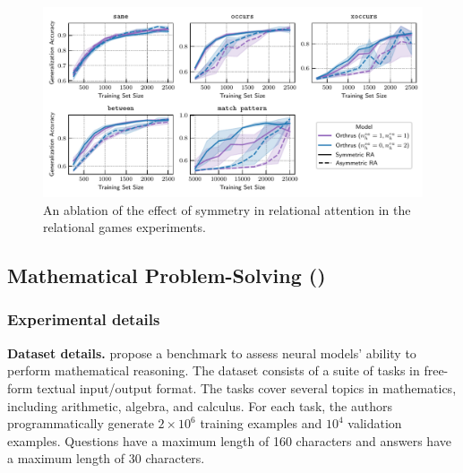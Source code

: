 \begin{figure}[h]
    \centering
    \includegraphics[width=\textwidth]{figs/experiments/relgames/relgames_learning_curves_symmetry_ablation.pdf}
    \caption{An ablation of the effect of symmetry in relational attention in the relational games experiments.}\label{fig:relgames_symmetry_ablation}
\end{figure}

\subsection{Mathematical Problem-Solving ()}\label{ssec:appendix_math}

\subsubsection*{Experimental details}

\textbf{Dataset details.} \citet{saxtonAnalyzingMathematicalReasoning2019} propose a benchmark to assess neural models' ability to perform mathematical reasoning. The dataset consists of a suite of tasks in free-form textual input/output format. The tasks cover several topics in mathematics, including arithmetic, algebra, and calculus. For each task, the authors programmatically generate $2 \times 10^6$ training examples and $10^4$ validation examples. Questions have a maximum length of 160 characters and answers have a maximum length of 30 characters.

